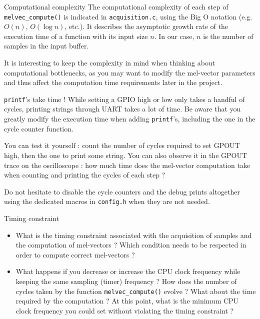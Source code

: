 \begin{bclogo}[couleur = gray!20, arrondi = 0.2, logo=\bcinfo]{Computational complexity}
The computational complexity of each step of \texttt{melvec\_compute()} is indicated in \texttt{acquisition.c}, using the Big O notation (e.g. $O(n)$, $O(\log{n})$, etc.). It describes the asymptotic growth rate of the execution time of a function with its input size $n$. In our case, $n$ is the number of samples in the input buffer.

It is interesting to keep the complexity in mind when thinking about computational bottlenecks, as you may want to modify the mel-vector parameters and thus affect the computation time requirements later in the project.
\end{bclogo}

\begin{bclogo}[couleur = gray!20, arrondi = 0.2, logo=\bcattention]{\texttt{printf}'s take time !}
While setting a GPIO high or low only takes a handful of cycles, printing strings through UART takes a lot of time. Be aware that you greatly modify the execution time when adding \texttt{printf}'s, including the one in the cycle counter function.

You can test it yourself : count the number of cycles required to set GPOUT high, then the one to print some string. You can also observe it in the GPOUT trace on the oscilloscope : how much time does the mel-vector computation take when counting and printing the cycles of each step ?

Do not hesitate to disable the cycle counters and the debug prints altogether using the dedicated macros in \texttt{config.h} when they are not needed.
\end{bclogo}

\begin{bclogo}[couleur = gray!20, arrondi = 0.2, logo=\bcquestion]{Timing constraint}
\begin{itemize}
	\item What is the timing constraint associated with the acquisition of samples and the computation of mel-vectors ? Which condition needs to be respected in order to compute correct mel-vectors ?
	\item What happens if you decrease or increase the CPU clock frequency while keeping the same sampling (timer) frequency ? How does the number of cycles taken by the function \texttt{melvec\_compute()} evolve ? What about the time required by the computation ? At this point, what is the minimum CPU clock frequency you could set without violating the timing constraint ?
\end{itemize}
\end{bclogo}

